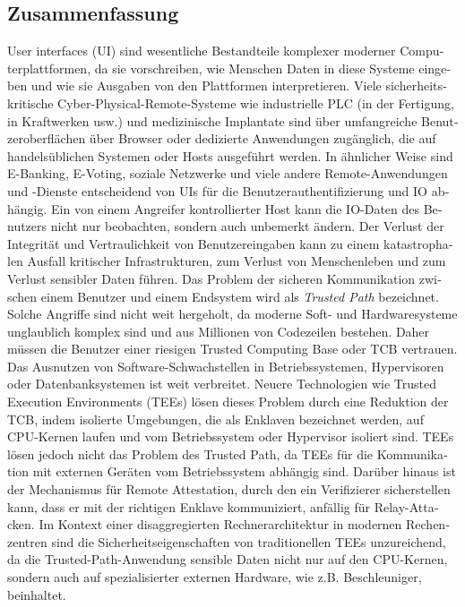 
\cleardoublepage%

\begingroup
\let\clearpage\relax
\let\cleardoublepage\relax
\let\cleardoublepage\relax

\begin{otherlanguage}{ngerman}
\chapter*{Zusammenfassung}

User interfaces (UI) sind wesentliche Bestandteile komplexer moderner Computerplattformen, da sie vorschreiben, wie Menschen Daten in diese Systeme eingeben und wie sie Ausgaben von den Plattformen interpretieren. Viele sicherheitskritische Cyber-Physical-Remote-Systeme wie industrielle PLC (in der Fertigung, in Kraftwerken usw.) und medizinische Implantate sind \"uber umfangreiche Benutzeroberfl\"achen \"uber Browser oder dedizierte Anwendungen zug\"anglich, die auf handels\"ublichen Systemen oder Hosts ausgef\"uhrt werden. In \"ahnlicher Weise sind E-Banking, E-Voting, soziale Netzwerke und viele andere Remote-Anwendungen und -Dienste entscheidend von UIs f\"ur die Benutzerauthentifizierung und IO abh\"angig. Ein von einem Angreifer kontrollierter Host kann die IO-Daten des Benutzers nicht nur beobachten, sondern auch unbemerkt \"andern. Der Verlust der Integrit\"at und Vertraulichkeit von Benutzereingaben kann zu einem katastrophalen Ausfall kritischer Infrastrukturen, zum Verlust von Menschenleben und zum Verlust sensibler Daten f\"uhren. Das Problem der sicheren Kommunikation zwischen einem Benutzer und einem Endsystem wird als \emph{Trusted Path} bezeichnet. Solche Angriffe sind nicht weit hergeholt, da moderne Soft- und Hardwaresysteme unglaublich komplex sind und aus Millionen von Codezeilen bestehen. Daher m\"ussen die Benutzer einer riesigen Trusted Computing Base oder TCB vertrauen. Das Ausnutzen von Software-Schwachstellen in Betriebssystemen, Hypervisoren oder Datenbanksystemen ist weit verbreitet. Neuere Technologien wie Trusted Execution Environments (TEEs) l\"osen dieses Problem durch eine Reduktion der TCB, indem isolierte Umgebungen, die als Enklaven bezeichnet werden, auf CPU-Kernen laufen und vom Betriebssystem oder Hypervisor isoliert sind. TEEs l\"osen jedoch nicht das Problem des Trusted Path, da TEEs f\"ur die Kommunikation mit externen Ger\"aten vom Betriebssystem abh\"angig sind. Dar\"uber hinaus ist der Mechanismus f\"ur Remote Attestation, durch den ein Verifizierer sicherstellen kann, dass er mit der richtigen Enklave kommuniziert, anf\"allig f\"ur Relay-Attacken. Im Kontext einer disaggregierten Rechnerarchitektur in modernen Rechenzentren sind die Sicherheitseigenschaften von traditionellen TEEs unzureichend, da die Trusted-Path-Anwendung sensible Daten nicht nur auf den CPU-Kernen, sondern auch auf spezialisierter externen Hardware, wie z.B. Beschleuniger, beinhaltet.



\end{otherlanguage}
